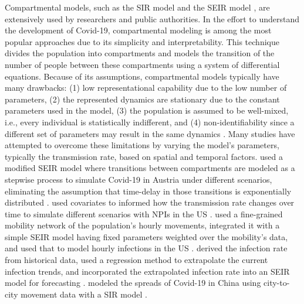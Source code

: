 Compartmental models, such as the \gls{SIR} model and the \gls{SEIR} model \cite{kermackContributionMathematicalTheory1927, kermackContributionsMathematicalTheory1932, kermackContributionsMathematicalTheory1933, brauerCompartmentalModelsEpidemiology2008}, are extensively used by researchers and public authorities.
In the effort to understand the development of Covid-19, compartmental modeling is among the most popular approaches due to its simplicity and interpretability.
This technique divides the population into compartments and models the transition of the number of people between these compartments using a system of differential equations.
Because of its assumptions, compartmental models typically have many drawbacks: (1) low representational capability due to the low number of parameters, (2) the represented dynamics are stationary due to the constant parameters used in the model, (3) the population is assumed to be well-mixed, i.e., every individual is statistically indifferent, and (4) non-identifiability since a different set of parameters may result in the same dynamics \cite{roosaAssessingParameterIdentifiability2019}.
Many studies have attempted to overcome these limitations by varying the model's parameters, typically the transmission rate, based on spatial and temporal factors.
\citeauthor{schneiderCOVID19PandemicPreparedness2020} used a modified \gls{SEIR} model where transitions between compartments are modeled as a stepwise process to simulate Covid-19 in Austria under different scenarios, eliminating the assumption that time-delay in those transitions is exponentially distributed \cite{schneiderCOVID19PandemicPreparedness2020}.
\citeauthor{ihmecovid-19forecastingteamModelingCOVID19Scenarios2021} used covariates to informed how the transmission rate changes over time to simulate different scenarios with \glspl{NPI} in the \gls{US} \cite{ihmecovid-19forecastingteamModelingCOVID19Scenarios2021}.
\citeauthor{changMobilityNetworkModels2021} used a fine-grained mobility network of the population's hourly movements, integrated it with a simple \gls{SEIR} model having fixed parameters weighted over the mobility's data, and used that to model hourly infections in the \gls{US} \cite{changMobilityNetworkModels2021}.
\citeauthor{chenTimeDependentSIRModel2020} derived the infection rate from historical data, used a regression method to extrapolate the current infection trends, and incorporated the extrapolated infection rate into an \gls{SEIR} model for forecasting \cite{chenTimeDependentSIRModel2020}.
\citeauthor{liSubstantialUndocumentedInfection2020} modeled the spreads of Covid-19 in China using city-to-city movement data with a \gls{SIR} model \cite{liSubstantialUndocumentedInfection2020}.

